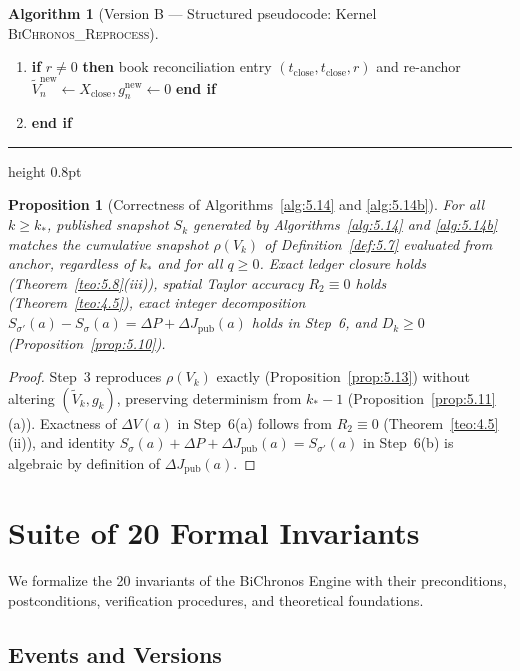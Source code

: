 \documentclass[11pt, a4paper]{article}
\theoremstyle{definition}
\newtheorem{algoritmo}[definicao]{Algorithm}
\theoremstyle{plain}
\newtheorem{proposicao}[definicao]{Proposition}
\theoremstyle{remark}
\begin{document}
\begin{algoritmo}[Version B — Structured pseudocode: Kernel \textsc{BiChronos\_Reprocess}]
\begin{enumerate}[label=\footnotesize\textbf{\arabic*:}, leftmargin=2.2em, itemsep=0.15em, topsep=0.3em]
    \item \hspace{1.2em} \textbf{if} $r \neq 0$ \textbf{then} book reconciliation entry $(t_{\text{close}}, t_{\text{close}}, r)$ and re-anchor $\tilde{V}_n^{\text{new}} \leftarrow X_{\text{close}}, g_n^{\text{new}} \leftarrow 0$ \textbf{end if}
    \item \textbf{end if}
\end{enumerate}
\hrule height 0.8pt
\vspace{0.2em}
\end{algoritmo}

\begin{proposicao}[Correctness of Algorithms~\ref{alg:5.14} and \ref{alg:5.14b}]\label{prop:5.15}
For all $k \ge k_*$, published snapshot $S_k$ generated by Algorithms~\ref{alg:5.14} and \ref{alg:5.14b} matches the cumulative snapshot $\rho(V_k)$ of Definition~\ref{def:5.7} evaluated from anchor, regardless of $k_*$ and for all $q \ge 0$. Exact ledger closure holds (Theorem~\ref{teo:5.8}(iii)), spatial Taylor accuracy $R_2 \equiv 0$ holds (Theorem~\ref{teo:4.5}), exact integer decomposition $S_{\sigma'}(a) - S_\sigma(a) = \Delta P + \Delta J_{\text{pub}}(a)$ holds in Step~6, and $D_k \ge 0$ (Proposition~\ref{prop:5.10}).
\end{proposicao}
\begin{proof}
Step~3 reproduces $\rho(V_k)$ exactly (Proposition~\ref{prop:5.13}) without altering $(\tilde{V}_k, g_k)$, preserving determinism from $k_* - 1$ (Proposition~\ref{prop:5.11}(a)). Exactness of $\Delta V(a)$ in Step~6(a) follows from $R_2 \equiv 0$ (Theorem~\ref{teo:4.5}(ii)), and identity $S_\sigma(a) + \Delta P + \Delta J_{\text{pub}}(a) = S_{\sigma'}(a)$ in Step~6(b) is algebraic by definition of $\Delta J_{\text{pub}}(a)$.
\end{proof}

\section{Suite of 20 Formal Invariants}\label{sec:6}

We formalize the 20 invariants of the BiChronos Engine with their preconditions, postconditions, verification procedures, and theoretical foundations.

\subsection{Events and Versions}
\end{document}
